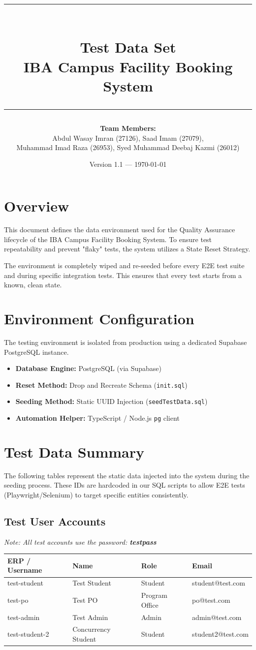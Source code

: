 \documentclass[11pt,a4paper]{article}
\title{
    \rule{\textwidth}{1pt} \\
    \textbf{\Large Test Data Set} \\
    \large IBA Campus Facility Booking System \\
    \rule{\textwidth}{1pt}
}
\author{
    \textbf{Team Members:} \\
    Abdul Wasay Imran (27126), Saad Imam (27079), \\
    Muhammad Imad Raza (26953), Syed Muhammad Deebaj Kazmi (26012)
}
\date{Version 1.1 --- \today}
\begin{document}
\maketitle
\tableofcontents
\newpage

\section{Overview}
This document defines the data environment used for the Quality Assurance lifecycle of the IBA Campus Facility Booking System. To ensure test repeatability and prevent "flaky" tests, the system utilizes a State Reset Strategy. 

The environment is completely wiped and re-seeded before every E2E test suite and during specific integration tests. This ensures that every test starts from a known, clean state.

\section{Environment Configuration}
The testing environment is isolated from production using a dedicated Supabase PostgreSQL instance.
\begin{itemize}
    \item \textbf{Database Engine:} PostgreSQL (via Supabase)
    \item \textbf{Reset Method:} Drop and Recreate Schema (\texttt{init.sql})
    \item \textbf{Seeding Method:} Static UUID Injection (\texttt{seedTestData.sql})
    \item \textbf{Automation Helper:} TypeScript / Node.js \texttt{pg} client
\end{itemize}

\section{Test Data Summary}
The following tables represent the static data injected into the system during the seeding process. These IDs are hardcoded in our SQL scripts to allow E2E tests (Playwright/Selenium) to target specific entities consistently.

\subsection{Test User Accounts}
\textit{Note: All test accounts use the password: \textbf{testpass}}
\begin{center}
\begin{tabular}{@{}llll@{}}
\toprule
\textbf{ERP / Username} & \textbf{Name} & \textbf{Role} & \textbf{Email} \\ \midrule
test-student & Test Student & Student & student@test.com \\
test-po & Test PO & Program Office & po@test.com \\
test-admin & Test Admin & Admin & admin@test.com \\
test-student-2 & Concurrency Student & Student & student2@test.com \\ \bottomrule
\end{tabular}
\end{center}
\end{document}

